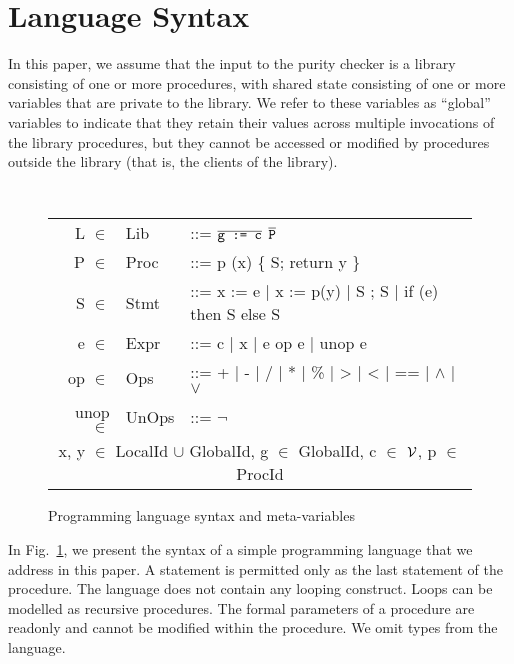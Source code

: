 \newcommand{\elt}{\ensuremath{\in} }
\newcommand{\domain}[1]{#1}

\section{Language Syntax}
\label{sec:background}

In this paper, we assume that the input to the purity checker is a library consisting
of one or more procedures, with shared state consisting of one or more variables
that are private to the library. We refer to these variables as ``global'' variables to
indicate that they retain their values across multiple invocations of the library
procedures, but they cannot be accessed or modified by procedures outside
the library (that is, the clients of the library).

\begin{figure}[t!]
{\tt
\begin{tabular}{rll}
L \elt & \domain{Lib} & ::= $\overline{\texttt{g := c}}$ $\overline{\texttt{P}}$ \\
P \elt & \domain{Proc} & ::= p (x) \{ S; return y \} \\
S \elt & \domain{Stmt} & ::=  x := e | x := p(y) | S ; S | if (e) then S else S \\
e \elt & \domain{Expr} & ::= c | x | e op e | unop e \\
op \elt & \domain{Ops} & ::= + | - | / | * | \% | > | < | == | $\wedge$ | $\vee$ \\
unop \elt & \domain{UnOps} & ::= $\neg$ \\
\multicolumn{3}{c}{
x, y \elt  \domain{LocalId} $\cup$ \domain{GlobalId},
g \elt \domain{GlobalId},
c \elt $\mathcal{V}$,
p \elt \domain{ProcId}
}
\end{tabular}
}
\caption{Programming language syntax and meta-variables}
 \label{fig:grammar}
\end{figure}

In Fig.~\ref{fig:grammar}, we present the syntax of a simple
programming language that we address in this paper.
A  statement is permitted only as the last statement of
the procedure.
The language does not contain any looping construct.
Loops can be modelled as recursive procedures.
The formal parameters of a procedure are readonly and cannot be
modified within the procedure.
We omit types from the language.

